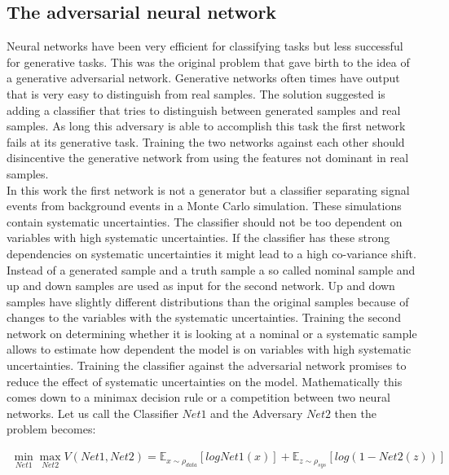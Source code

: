 \subsection{The adversarial neural network}

Neural networks have been very efficient for classifying tasks but less successful for generative tasks. This was the original problem that gave birth to the idea of a generative adversarial network. Generative networks often times have output that is very easy to distinguish from real samples. The solution suggested is adding a classifier that tries to distinguish between generated samples and real samples. As long this adversary is able to accomplish this task the first network fails at its generative task. Training the two networks against each other should disincentive the generative network from using the features not dominant in real samples.\\
In this work the first network is not a generator but a classifier separating signal events from background events in a Monte Carlo simulation. These simulations contain systematic uncertainties. The classifier should not be too dependent on variables with high systematic uncertainties. If the classifier has these strong dependencies on systematic uncertainties it might lead to a high co-variance shift. Instead of a generated sample and a truth sample a so called nominal sample and up and down samples are used as input for the second network. Up and down samples have slightly different distributions than the original samples because of changes to the variables with the systematic uncertainties. Training the second network on determining whether it is looking at a nominal or a systematic sample allows to estimate how dependent the model is on variables with high systematic uncertainties. Training the classifier against the adversarial network promises to reduce the effect of systematic uncertainties on the model.
Mathematically this comes down to a minimax decision rule or a competition between two neural networks. Let us call the Classifier $Net1$ and the Adversary $Net2$ then the problem becomes:

\begin{align}
    \min_{Net1} \max_{Net2} V(Net1, Net2) = \mathbb{E}_{\mathit{x} \sim \rho_{data}} [ log Net1(\mathit{x}) ] + \mathbb{E}_{\mathit{z} \sim \rho_{sys}} [ log (1 - Net2(\mathit{z}) ) ]
\end{align}


